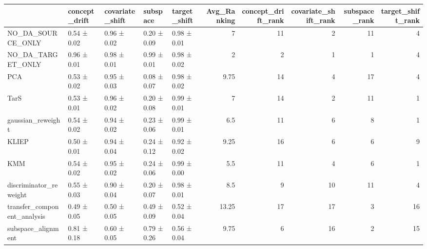 \begin{tabular}{lllllrrrrr}
\hline
                              & concept\_drift   & covariate\_shift   & subspace    & target\_shift   &   Avg\_Ranking &   concept\_drift\_rank &   covariate\_shift\_rank &   subspace\_rank &   target\_shift\_rank \\
\hline
 NO\_DA\_SOURCE\_ONLY            & 0.54 ± 0.02     & 0.96 ± 0.02       & 0.20 ± 0.09 & 0.98 ± 0.01    &          7    &                   11 &                      2 &              11 &                   4 \\
 NO\_DA\_TARGET\_ONLY            & 0.96 ± 0.01     & 0.98 ± 0.01       & 0.99 ± 0.01 & 0.98 ± 0.02    &          2    &                    2 &                      1 &               1 &                   4 \\
 PCA                          & 0.53 ± 0.02     & 0.95 ± 0.03       & 0.08 ± 0.07 & 0.98 ± 0.02    &          9.75 &                   14 &                      4 &              17 &                   4 \\
 TarS                         & 0.53 ± 0.01     & 0.96 ± 0.02       & 0.20 ± 0.08 & 0.99 ± 0.01    &          7    &                   14 &                      2 &              11 &                   1 \\
 gaussian\_reweight            & 0.54 ± 0.02     & 0.94 ± 0.02       & 0.23 ± 0.06 & 0.99 ± 0.01    &          6.5  &                   11 &                      6 &               8 &                   1 \\
 KLIEP                        & 0.50 ± 0.01     & 0.94 ± 0.04       & 0.24 ± 0.12 & 0.92 ± 0.02    &          9.25 &                   16 &                      6 &               6 &                   9 \\
 KMM                          & 0.54 ± 0.02     & 0.95 ± 0.02       & 0.24 ± 0.06 & 0.99 ± 0.00    &          5.5  &                   11 &                      4 &               6 &                   1 \\
 discriminator\_reweight       & 0.55 ± 0.03     & 0.90 ± 0.04       & 0.20 ± 0.07 & 0.98 ± 0.01    &          8.5  &                    9 &                     10 &              11 &                   4 \\
 transfer\_component\_analysis  & 0.49 ± 0.05     & 0.50 ± 0.05       & 0.49 ± 0.09 & 0.52 ± 0.04    &         13.25 &                   17 &                     17 &               3 &                  16 \\
 subspace\_alignment           & 0.81 ± 0.18     & 0.60 ± 0.05       & 0.79 ± 0.26 & 0.56 ± 0.04    &          9.75 &                    6 &                     16 &               2 &                  15 \\

\end{tabular}
